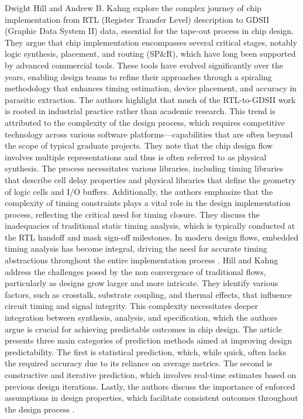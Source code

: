 Dwight Hill and Andrew B. Kahng explore the complex journey of chip implementation from RTL (Register Transfer Level) description to GDSII (Graphic Data System II) data, essential for the tape-out process in chip design. They argue that chip implementation encompasses several critical stages, notably logic synthesis, placement, and routing (SP\&R), which have long been supported by advanced commercial tools. These tools have evolved significantly over the years, enabling design teams to refine their approaches through a spiraling methodology that enhances timing estimation, device placement, and accuracy in parasitic extraction. The authors highlight that much of the RTL-to-GDSII work is rooted in industrial practice rather than academic research. This trend is attributed to the complexity of the design process, which requires competitive technology across various software platforms—capabilities that are often beyond the scope of typical graduate projects. They note that the chip design flow involves multiple representations and thus is often referred to as physical synthesis. The process necessitates various libraries, including timing libraries that describe cell delay properties and physical libraries that define the geometry of logic cells and I/O buffers. Additionally, the authors emphasize that the complexity of timing constraints plays a vital role in the design implementation process, reflecting the critical need for timing closure. They discuss the inadequacies of traditional static timing analysis, which is typically conducted at the RTL handoff and mask sign-off milestones. In modern design flows, embedded timing analysis has become integral, driving the need for accurate timing abstractions throughout the entire implementation process \cite{hill2004guest}.
Hill and Kahng address the challenges posed by the non convergence of traditional flows, particularly as designs grow larger and more intricate. They identify various factors, such as crosstalk, substrate coupling, and thermal effects, that influence circuit timing and signal integrity. This complexity necessitates deeper integration between synthesis, analysis, and specification, which the authors argue is crucial for achieving predictable outcomes in chip design. The article presents three main categories of prediction methods aimed at improving design predictability. The first is statistical prediction, which, while quick, often lacks the required accuracy due to its reliance on average metrics. The second is constructive and iterative prediction, which involves real-time estimates based on previous design iterations. Lastly, the authors discuss the importance of enforced assumptions in design properties, which facilitate consistent outcomes throughout the design process \cite{hill2004guest}.
